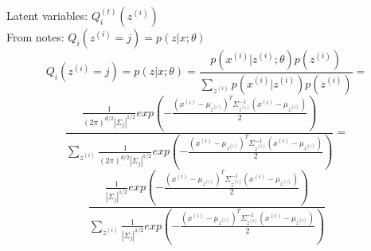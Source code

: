 \begin{answer}
Latent variables: $Q_i^{(t)}(z^{(i)})$  \\
From notes: $Q_i(z^{(i)}=j) = p(z|x;\theta)$
$$Q_i(z^{(i)}=j) = p(z|x;\theta) = \frac{p(x^{(i)}|z^{(i)};\theta) p(z^{(i)})}{\sum_{z^{(i)}} p(x^{(i)}|z^{(i)})p(z^{(i)})} = $$
$$\frac{\frac{1}{(2\pi)^{d/2}|\Sigma_j|^{1/2}}  exp(-\frac{(x^{(i)} - \mu_{z^{(i)}})^T \Sigma_{z^{(i)}}^{-1}(x^{(i)} - \mu_{z^{(i)}}) }{2})}
{\sum_{z^{(i)}}\frac{1}{(2\pi)^{d/2}|\Sigma_j|^{1/2}}  exp(-\frac{(x^{(i)} - \mu_{z^{(i)}})^T \Sigma_{z^{(i)}}^{-1}(x^{(i)} - \mu_{z^{(i)}}) }{2})} = $$
$$\frac{\frac{1}{|\Sigma_j|^{1/2}}  exp(-\frac{(x^{(i)} - \mu_{z^{(i)}})^T \Sigma_{z^{(i)}}^{-1}(x^{(i)} - \mu_{z^{(i)}}) }{2})}
{\sum_{z^{(i)}}\frac{1}{|\Sigma_j|^{1/2}}  exp(-\frac{(x^{(i)} - \mu_{z^{(i)}})^T \Sigma_{z^{(i)}}^{-1}(x^{(i)} - \mu_{z^{(i)}}) }{2})} $$
\end{answer}
